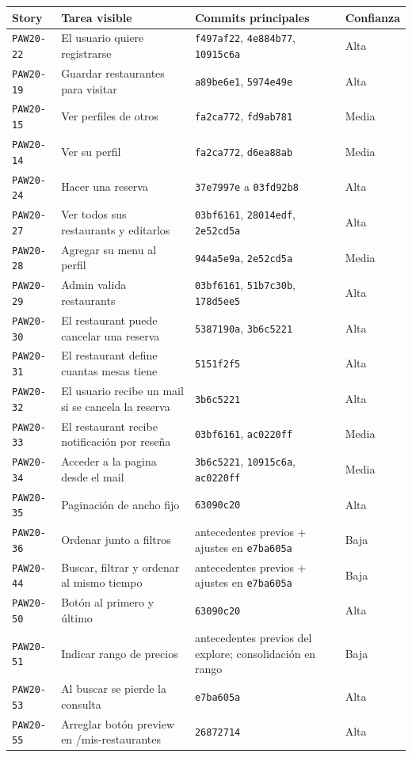 \documentclass[11pt,a4paper]{report}
\newcommand{\commit}[1]{\texttt{#1}}
\newcommand{\story}[1]{\texttt{#1}}
\begin{document}
\small
\begin{longtable}{p{}p{}p{}p{}}
\toprule
\textbf{Story} & \textbf{Tarea visible} & \textbf{Commits principales} & \textbf{Confianza} \\
\midrule
\endhead
\story{PAW20-22} & El usuario quiere registrarse & \commit{f497af22}, \commit{4e884b77}, \commit{10915c6a} & Alta \\
\story{PAW20-19} & Guardar restaurantes para visitar & \commit{a89be6e1}, \commit{5974e49e} & Alta \\
\story{PAW20-15} & Ver perfiles de otros & \commit{fa2ca772}, \commit{fd9ab781} & Media \\
\story{PAW20-14} & Ver su perfil & \commit{fa2ca772}, \commit{d6ea88ab} & Media \\
\story{PAW20-24} & Hacer una reserva & \commit{37e7997e} a \commit{03fd92b8} & Alta \\
\story{PAW20-27} & Ver todos sus restaurants y editarlos & \commit{03bf6161}, \commit{28014edf}, \commit{2e52cd5a} & Alta \\
\story{PAW20-28} & Agregar su menu al perfil & \commit{944a5e9a}, \commit{2e52cd5a} & Media \\
\story{PAW20-29} & Admin valida restaurants & \commit{03bf6161}, \commit{51b7c30b}, \commit{178d5ee5} & Alta \\
\story{PAW20-30} & El restaurant puede cancelar una reserva & \commit{5387190a}, \commit{3b6c5221} & Alta \\
\story{PAW20-31} & El restaurant define cuantas mesas tiene & \commit{5151f2f5} & Alta \\
\story{PAW20-32} & El usuario recibe un mail si se cancela la reserva & \commit{3b6c5221} & Alta \\
\story{PAW20-33} & El restaurant recibe notificaci\'on por rese\~na & \commit{03bf6161}, \commit{ac0220ff} & Media \\
\story{PAW20-34} & Acceder a la pagina desde el mail & \commit{3b6c5221}, \commit{10915c6a}, \commit{ac0220ff} & Media \\
\story{PAW20-35} & Paginaci\'on de ancho fijo & \commit{63090c20} & Alta \\
\story{PAW20-36} & Ordenar junto a filtros & antecedentes previos + ajustes en \commit{e7ba605a} & Baja \\
\story{PAW20-44} & Buscar, filtrar y ordenar al mismo tiempo & antecedentes previos + ajustes en \commit{e7ba605a} & Baja \\
\story{PAW20-50} & Bot\'on al primero y \'ultimo & \commit{63090c20} & Alta \\
\story{PAW20-51} & Indicar rango de precios & antecedentes previos del explore; consolidaci\'on en rango & Baja \\
\story{PAW20-53} & Al buscar se pierde la consulta & \commit{e7ba605a} & Alta \\
\story{PAW20-55} & Arreglar bot\'on preview en /mis-restaurantes & \commit{26872714} & Alta \\
\bottomrule
\end{longtable}
\normalsize
\end{document}
